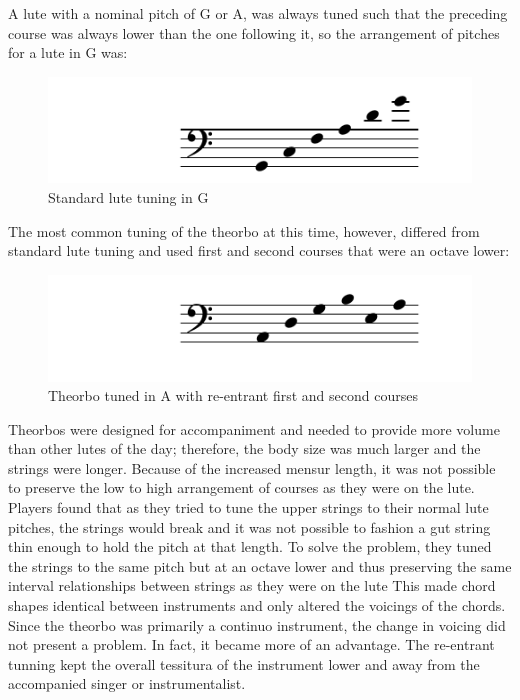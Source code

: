 A lute with a nominal pitch of G or A, was always tuned such that the preceding course was
always lower than the one following it, so the arrangement of pitches for a lute in G was:
\begin{figure}[h]
\centering
\includegraphics{examples/lute-tuning.pdf}
\caption{Standard lute tuning in G}
\end{figure}
The most common tuning of the theorbo at this time, however, differed from standard lute
tuning and used first and second courses that were an octave lower:
\begin{figure}[h]
\centering
\includegraphics{examples/theorbo-tuning.pdf}
\caption{Theorbo tuned in A with re-entrant first and second courses}
\end{figure}

Theorbos were designed for accompaniment and needed to provide more volume than other
lutes of the day; therefore, the body size was much larger and the strings were longer.
Because of the increased mensur length, it was not possible to preserve the low to high
arrangement of courses as they were on the lute. Players found that as they tried to tune
the upper strings to their normal lute pitches, the strings would break and it was not
possible to fashion a gut string thin enough to hold the pitch at that length.  To solve
the problem, they tuned the strings to the same pitch but at an octave lower and thus
preserving the same interval relationships between strings as they were on the lute  This
made chord shapes identical between instruments and only altered the voicings of the
chords. Since the theorbo was primarily a continuo instrument, the change in voicing did
not present a problem. In fact, it became more of an advantage.  The re-entrant tunning
kept the overall tessitura of the instrument lower and away from the accompanied singer or
instrumentalist.

